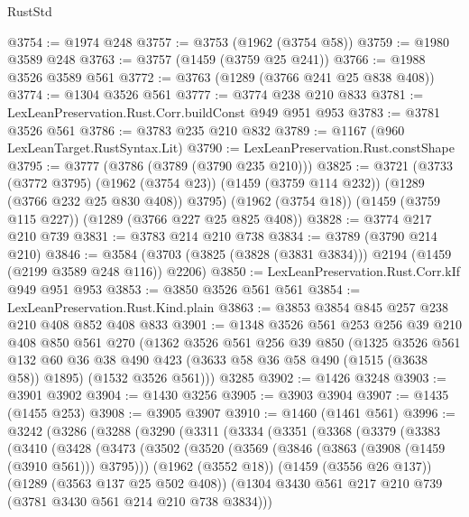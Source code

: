 \begin{lexlean}{RustStd}
\begin{coremodule}
@3754 := @1974 @248
@3757 := @3753 (@1962 (@3754 @58))
@3759 := @1980 @3589 @248
@3763 := @3757 (@1459 (@3759 @25 @241))
@3766 := @1988 @3526 @3589 @561
@3772 := @3763 (@1289 (@3766 @241 @25 @838 @408))
@3774 := @1304 @3526 @561
@3777 := @3774 @238 @210 @833
@3781 := LexLeanPreservation.Rust.Corr.buildConst @949 @951 @953
@3783 := @3781 @3526 @561
@3786 := @3783 @235 @210 @832
@3789 := @1167 (@960 LexLeanTarget.RustSyntax.Lit)
@3790 := LexLeanPreservation.Rust.constShape
@3795 := @3777 (@3786 (@3789 (@3790 @235 @210)))
@3825 := @3721
    (@3733
      (@3772 @3795)
      (@1962 (@3754 @23))
      (@1459 (@3759 @114 @232))
      (@1289 (@3766 @232 @25 @830 @408))
      @3795)
    (@1962 (@3754 @18))
    (@1459 (@3759 @115 @227))
    (@1289 (@3766 @227 @25 @825 @408))
@3828 := @3774 @217 @210 @739
@3831 := @3783 @214 @210 @738
@3834 := @3789 (@3790 @214 @210)
@3846 := @3584 (@3703 (@3825 (@3828 (@3831 @3834))) @2194 (@1459 (@2199 @3589 @248 @116)) @2206)
@3850 := LexLeanPreservation.Rust.Corr.kIf @949 @951 @953
@3853 := @3850 @3526 @561 @561
@3854 := LexLeanPreservation.Rust.Kind.plain
@3863 := @3853 @3854 @845 @257 @238 @210 @408 @852 @408 @833
@3901 := @1348
    @3526
    @561
    @253
    @256
    @39
    @210
    @408
    @850
    @561
    @270
    (@1362
      @3526
      @561
      @256
      @39
      @850
      (@1325
        @3526
        @561
        @132
        @60
        @36
        @38
        @490
        @423
        (@3633 @58 @36 @58 @490 (@1515 (@3638 @58)) @1895)
        (@1532 @3526 @561)))
    @3285
@3902 := @1426 @3248
@3903 := @3901 @3902
@3904 := @1430 @3256
@3905 := @3903 @3904
@3907 := @1435 (@1455 @253)
@3908 := @3905 @3907
@3910 := @1460 (@1461 @561)
@3996 := @3242
    (@3286
      (@3288
        (@3290
          (@3311
            (@3334
              (@3351
                (@3368
                  (@3379
                    (@3383
                      (@3410
                        (@3428
                          (@3473
                            (@3502
                              (@3520
                                (@3569 (@3846 (@3863 (@3908 (@1459 (@3910 @561))) @3795)))
                                (@1962 (@3552 @18))
                                (@1459 (@3556 @26 @137))
                                (@1289 (@3563 @137 @25 @502 @408))
                                (@1304
                                  @3430
                                  @561
                                  @217
                                  @210
                                  @739
                                  (@3781 @3430 @561 @214 @210 @738 @3834)))

\end{coremodule}
\end{lexlean}
